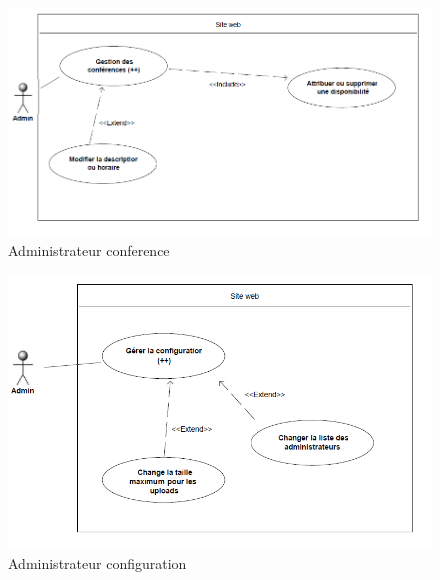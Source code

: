     \begin{figure}[h]
        \begin{center}
            \includegraphics[scale=0.75]{images/uml/adminConference.png} 
        \end{center}

        \caption{Administrateur conference}
        \label{Administrateur conference}
    \end{figure}

    \begin{figure}[h]
        \begin{center}
            \includegraphics[scale=0.85]{images/uml/adminConfiguration.png} 
        \end{center}

        \caption{Administrateur configuration}
        \label{Administrateur configuration}
    \end{figure}

